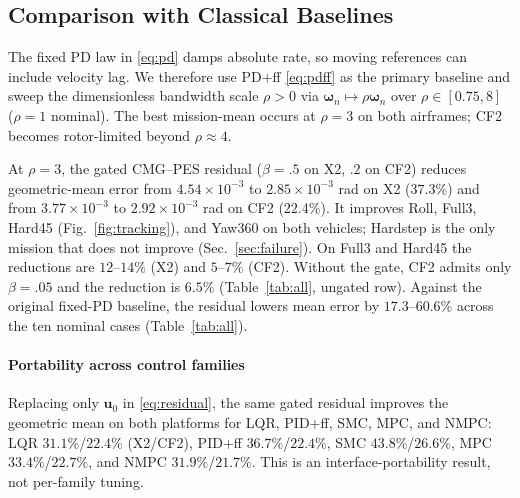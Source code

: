 \documentclass[letterpaper, 10 pt, conference]{ieeeconf}
\begin{document}
\subsection{Comparison with Classical Baselines}
\label{sec:baselines}

The fixed PD law in \eqref{eq:pd} damps absolute rate, so moving references can include velocity lag. We therefore use PD+ff \eqref{eq:pdff} as the primary baseline and sweep the dimensionless bandwidth scale $\rho>0$ via $\bm\omega_n\mapsto\rho\bm\omega_n$ over $\rho\in[0.75,8]$ ($\rho=1$ nominal). The best mission-mean occurs at $\rho=3$ on both airframes; CF2 becomes rotor-limited beyond $\rho\approx4$.

At $\rho=3$, the gated CMG--PES residual ($\beta=.5$ on X2, $.2$ on CF2) reduces geometric-mean error from $4.54\times10^{-3}$ to $2.85\times10^{-3}$ rad on X2 ($37.3\%$) and from $3.77\times10^{-3}$ to $2.92\times10^{-3}$ rad on CF2 ($22.4\%$). It improves Roll, Full3, Hard45 (Fig.~\ref{fig:tracking}), and Yaw360 on both vehicles; Hardstep is the only mission that does not improve (Sec.~\ref{sec:failure}). On Full3 and Hard45 the reductions are $12$--$14\%$ (X2) and $5$--$7\%$ (CF2). Without the gate, CF2 admits only $\beta=.05$ and the reduction is $6.5\%$ (Table~\ref{tab:all}, ungated row). Against the original fixed-PD baseline, the residual lowers mean error by $17.3$--$60.6\%$ across the ten nominal cases (Table~\ref{tab:all}).

\paragraph{Portability across control families} Replacing only $\bm u_0$ in \eqref{eq:residual}, the same gated residual improves the geometric mean on both platforms for LQR, PID+ff, SMC, MPC, and NMPC: LQR $31.1\%$/$22.4\%$ (X2/CF2), PID+ff $36.7\%$/$22.4\%$, SMC $43.8\%$/$26.6\%$, MPC $33.4\%$/$22.7\%$, and NMPC $31.9\%$/$21.7\%$. This is an interface-portability result, not per-family tuning.



\end{document}
